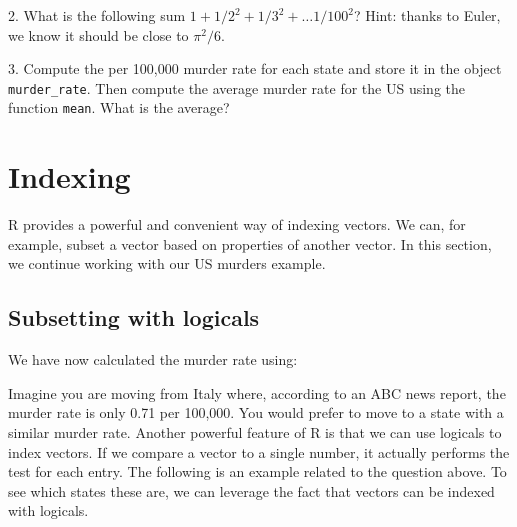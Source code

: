 \documentclass[
]{krantz}
\newenvironment{Shaded}{\begin{snugshade}}{\end{snugshade}}
\newcommand{\CommentTok}[1]{\textcolor[rgb]{0.37,0.37,0.37}{\textit{#1}}}
\newcommand{\DecValTok}[1]{\textcolor[rgb]{0.06,0.06,0.06}{#1}}
\newcommand{\KeywordTok}[1]{\textcolor[rgb]{0.27,0.27,0.27}{\textbf{#1}}}
\newcommand{\NormalTok}[1]{#1}
\newcommand{\OperatorTok}[1]{\textcolor[rgb]{0.43,0.43,0.43}{\textbf{#1}}}
\newcommand{\StringTok}[1]{\textcolor[rgb]{0.5,0.5,0.5}{#1}}
\begin{document}
2. What is the following sum \(1+1/2^2 + 1/3^2 + \dots 1/100^2\)? Hint: thanks to Euler, we know it should be close to \(\pi^2/6\).

3. Compute the per 100,000 murder rate for each state and store it in the object \texttt{murder\_rate}. Then compute the average murder rate for the US using the function \texttt{mean}. What is the average?

\begin{Shaded}
\end{Shaded}

\hypertarget{indexing}{%
\section{Indexing}\label{indexing}}

R provides a powerful and convenient way of indexing vectors. We can, for example, subset a vector based on properties of another vector. In this section, we continue working with our US murders example.

\hypertarget{subsetting-with-logicals}{%
\subsection{Subsetting with logicals}\label{subsetting-with-logicals}}

We have now calculated the murder rate using:

\begin{Shaded}
\end{Shaded}

Imagine you are moving from Italy where, according to an ABC news report, the murder rate is only 0.71 per 100,000. You would prefer to move to a state with a similar murder rate. Another powerful feature of R is that we can use logicals to index vectors. If we compare a vector to a single number, it actually performs the test for each entry. The following is an example related to the question above. To see which states these are, we can leverage the fact that vectors can be indexed with logicals.
\end{document}
